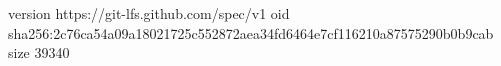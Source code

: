 version https://git-lfs.github.com/spec/v1
oid sha256:2c76ca54a09a18021725c552872aea34fd6464e7cf116210a87575290b0b9cab
size 39340
